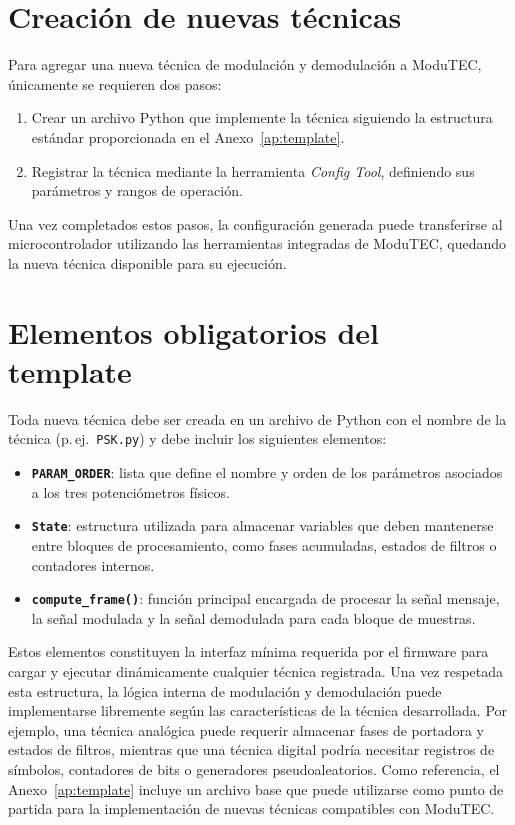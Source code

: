 \documentclass[12pt,letterpaper]{report}
\begin{document}
\section{Creación de nuevas técnicas}

Para agregar una nueva técnica de modulación y demodulación a ModuTEC, únicamente se requieren dos pasos:

\begin{enumerate}
\item Crear un archivo Python que implemente la técnica siguiendo la estructura estándar proporcionada en el Anexo~\ref{ap:template}.
\item Registrar la técnica mediante la herramienta \textit{Config Tool}, definiendo sus parámetros y rangos de operación.
\end{enumerate}

Una vez completados estos pasos, la configuración generada puede transferirse al microcontrolador utilizando las herramientas integradas de ModuTEC, quedando la nueva técnica disponible para su ejecución.

\section{Elementos obligatorios del template}

Toda nueva técnica debe ser creada en un archivo de Python con el nombre de la técnica (p.\,ej.\ \texttt{PSK.py}) y debe incluir los siguientes elementos:

\begin{itemize}

\item \textbf{\texttt{PARAM\_ORDER}}: lista que define el nombre y orden de los parámetros asociados a los tres potenciómetros físicos.

\item \textbf{\texttt{State}}: estructura utilizada para almacenar variables que deben mantenerse entre bloques de procesamiento, como fases acumuladas, estados de filtros o contadores internos.

\item \textbf{\texttt{compute\_frame()}}: función principal encargada de procesar la señal mensaje, la señal modulada y la señal demodulada para cada bloque de muestras.

\end{itemize}

Estos elementos constituyen la interfaz mínima requerida por el firmware para cargar y ejecutar dinámicamente cualquier técnica registrada. Una vez respetada esta estructura, la lógica interna de modulación y demodulación puede implementarse libremente según las características de la técnica desarrollada. Por ejemplo, una técnica analógica puede requerir almacenar fases de portadora y estados de filtros, mientras que una técnica digital podría necesitar registros de símbolos, contadores de bits o generadores pseudoaleatorios. Como referencia, el Anexo~\ref{ap:template} incluye un archivo base que puede utilizarse como punto de partida para la implementación de nuevas técnicas compatibles con ModuTEC.
\end{document}
